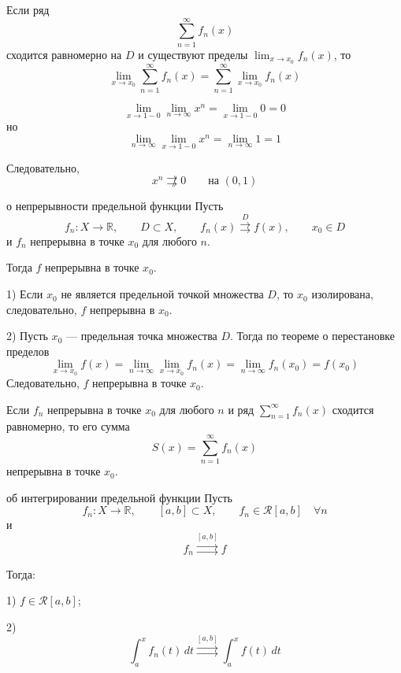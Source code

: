\documentclass[12pt,a4paper]{article}
\begin{document}
\begin{corollary}
    Если ряд
    \[
        \sum_{n=1}^{\infty}f_n(x)
    \]
    сходится равномерно на $D$ и существуют пределы $\displaystyle\lim_{x\to x_0}f_n(x)$, то
    \[
        \lim_{x\to x_0}\sum_{n=1}^{\infty}f_n(x)
        =
        \sum_{n=1}^{\infty}\lim_{x\to x_0}f_n(x)
    \]
\end{corollary}

\begin{example}
    \[
        \lim_{x\to1-0}\lim_{n\to\infty}x^n
        =
        \lim_{x\to1-0}0
        =
        0
    \]
    но
    \[
        \lim_{n\to\infty}\lim_{x\to1-0}x^n
        =
        \lim_{n\to\infty}1
        =
        1
    \]

    Следовательно,
    \[
        x^n\not\rightrightarrows 0
        \qquad\text{на }(0,1)
    \]
\end{example}

\begin{theorem}{о непрерывности предельной функции}
    Пусть
    \[
        f_n:X\to\mathbb{R},\qquad D\subset X,\qquad
        f_n(x)\overset{D}{\rightrightarrows}f(x),
        \qquad x_0\in D
    \]
    и $f_n$ непрерывна в точке $x_0$ для любого $n$.

    Тогда $f$ непрерывна в точке $x_0$.
\end{theorem}

\begin{proofbox}{}
    1) Если $x_0$ не является предельной точкой множества $D$, то $x_0$ изолирована, следовательно, $f$ непрерывна в $x_0$.

    2) Пусть $x_0$ --- предельная точка множества $D$. Тогда по теореме о перестановке пределов
    \[
        \lim_{x\to x_0}f(x)
        =
        \lim_{n\to\infty}\lim_{x\to x_0}f_n(x)
        =
        \lim_{n\to\infty}f_n(x_0)
        =
        f(x_0)
    \]
    Следовательно, $f$ непрерывна в точке $x_0$.
\end{proofbox}

\begin{corollary}
    Если $f_n$ непрерывна в точке $x_0$ для любого $n$ и ряд $\sum_{n=1}^{\infty}f_n(x)$ сходится равномерно, то его сумма
    \[
        S(x)=\sum_{n=1}^{\infty}f_n(x)
    \]
    непрерывна в точке $x_0$.
\end{corollary}

\begin{theorem}{об интегрировании предельной функции}
    Пусть
    \[
        f_n:X\to\mathbb{R},\qquad [a,b]\subset X,\qquad
        f_n\in\mathcal{R}[a,b]\quad\forall n
    \]
    и
    \[
        f_n\overset{[a,b]}{\rightrightarrows}f
    \]

    Тогда:

    1) $f\in\mathcal{R}[a,b]$;

    2)
    \[
        \int_a^x f_n(t)\,dt
        \overset{[a,b]}{\rightrightarrows}
        \int_a^x f(t)\,dt
    \]
\end{theorem}
\end{document}
